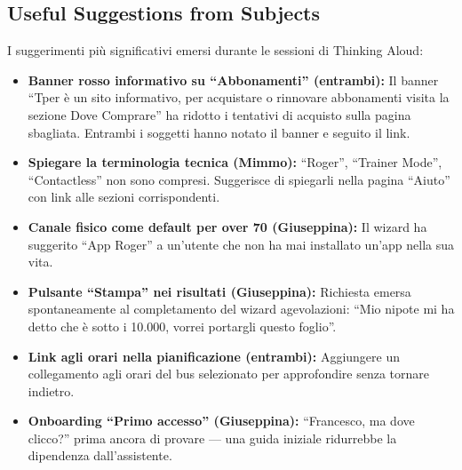 ﻿\documentclass[11pt,a4paper]{article}
\begin{document}
\subsection*{Useful Suggestions from Subjects}
\begin{tcolorbox}[base]
I suggerimenti più significativi emersi durante le sessioni di Thinking
Aloud:

\begin{itemize}[leftmargin=*]
  \item \textbf{Banner rosso informativo su ``Abbonamenti'' (entrambi):}
  Il banner ``Tper è un sito informativo, per acquistare o rinnovare abbonamenti visita la sezione Dove Comprare'' ha ridotto i tentativi di acquisto sulla pagina sbagliata. Entrambi i soggetti hanno notato il banner e seguito il link.

  \item \textbf{Spiegare la terminologia tecnica (Mimmo):} ``Roger'',
  ``Trainer Mode'', ``Contactless'' non sono compresi. Suggerisce di
  spiegarli nella pagina ``Aiuto'' con link alle sezioni corrispondenti.

  \item \textbf{Canale fisico come default per over 70 (Giuseppina):} Il
  wizard ha suggerito ``App Roger'' a un'utente che non ha mai
  installato un'app nella sua vita.

  \item \textbf{Pulsante ``Stampa'' nei risultati (Giuseppina):} Richiesta
  emersa spontaneamente al completamento del wizard agevolazioni: ``Mio
  nipote mi ha detto che è sotto i 10.000, vorrei portargli questo
  foglio''.

  \item \textbf{Link agli orari nella pianificazione (entrambi):}
  Aggiungere un collegamento agli orari del bus selezionato per
  approfondire senza tornare indietro.

  \item \textbf{Onboarding ``Primo accesso'' (Giuseppina):} ``Francesco,
  ma dove clicco?'' prima ancora di provare --- una guida iniziale
  ridurrebbe la dipendenza dall'assistente.
\end{itemize}
\end{tcolorbox}

\vspace{0.2cm}
\end{document}
